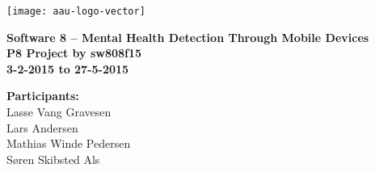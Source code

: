 \thispagestyle{empty} %

\hspace*{-1cm}\parbox[b][\textheight][t]{\textwidth}
{

\begin{center}
	\texttt{[image: aau-logo-vector]}\\
	\vspace{0.25cm}
\end{center} 

\vspace{1cm}
\begin{center}

\textbf{\Huge {Software 8 -- Mental Health Detection Through Mobile Devices}} \\ \vspace{0.5cm}
\textbf{\Large P8 Project by sw808f15}\\ \vspace{0.5cm}
\textbf{\large 3-2-2015 to 27-5-2015}\\
\end{center}



\vspace{0.25cm}
\begin{center}
\item {\textbf{Participants:}} \\
Lasse Vang Gravesen\\ Lars Andersen\\ Mathias Winde Pedersen\\ Søren Skibsted Als\\
\end{center}

\thispagestyle{empty}

\newpage
\thispagestyle{empty}
\mbox{}
}